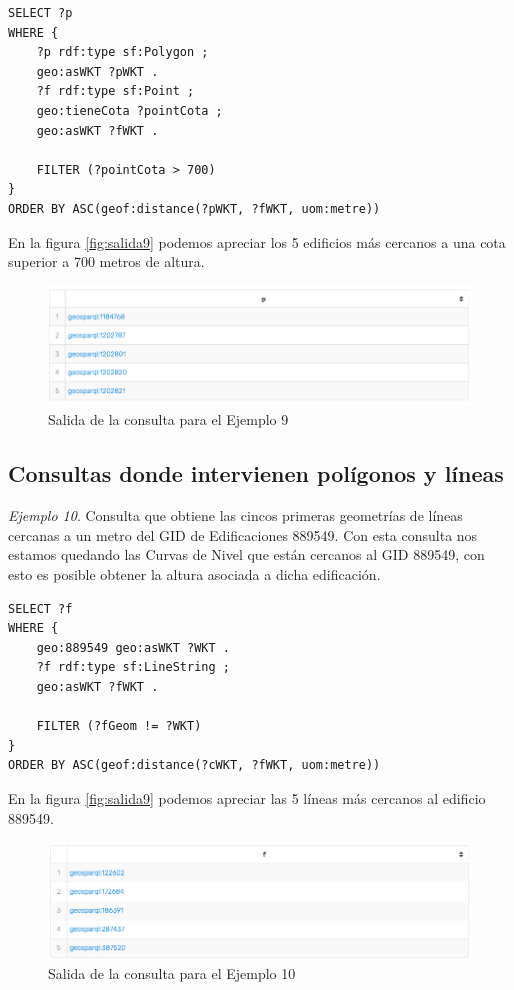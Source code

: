 \begin{lstlisting}
SELECT ?p
WHERE {
	?p rdf:type sf:Polygon ;
	geo:asWKT ?pWKT .
	?f rdf:type sf:Point ;
	geo:tieneCota ?pointCota ;
	geo:asWKT ?fWKT .
	
	FILTER (?pointCota > 700)
}
ORDER BY ASC(geof:distance(?pWKT, ?fWKT, uom:metre))
\end{lstlisting}

En la figura \ref{fig:salida9} podemos apreciar los 5 edificios más cercanos a una cota superior a 700 metros de altura.

\begin{figure}[H]
	\centering
	\includegraphics[width=1\linewidth]{imagenes/capitulo5/salida11}
	\caption{Salida de la consulta para el Ejemplo 9}
	\label{fig:salida11}
\end{figure}

\subsection{Consultas donde intervienen polígonos y líneas}

\textit{Ejemplo 10}. Consulta que obtiene las cincos primeras geometrías de líneas cercanas a un metro del GID de Edificaciones 889549. Con esta consulta nos estamos quedando las Curvas de Nivel que están cercanos al GID 889549, con esto es posible obtener la altura asociada a dicha edificación.

\vspace*{0.2cm}

\begin{lstlisting}
SELECT ?f
WHERE {
	geo:889549 geo:asWKT ?WKT .
	?f rdf:type sf:LineString ;
	geo:asWKT ?fWKT .
	
	FILTER (?fGeom != ?WKT)
}
ORDER BY ASC(geof:distance(?cWKT, ?fWKT, uom:metre))
\end{lstlisting}

En la figura \ref{fig:salida9} podemos apreciar las 5 líneas más cercanos al edificio 889549.

\begin{figure}[H]
	\centering
	\includegraphics[width=1\linewidth]{imagenes/capitulo5/salida10}
	\caption{Salida de la consulta para el Ejemplo 10}
	\label{fig:salida10}
\end{figure}

